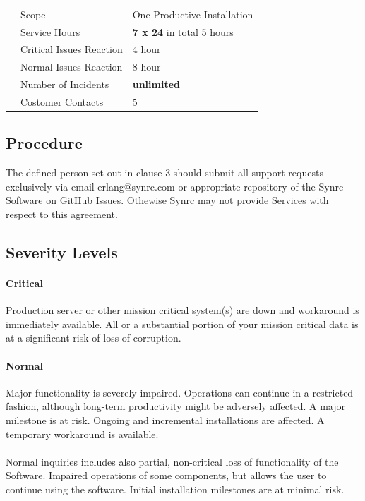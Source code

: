 \documentclass[11pt,oneside]{article}
\begin{document}
\begin{tabular}{lll}
        & Scope                    & One Productive Installation \\
        & Service Hours            & {\bf 7 x 24} in total 5 hours\\
        & Critical Issues Reaction & 4 hour \\
        & Normal Issues Reaction   & 8 hour \\
        & Number of Incidents      & {\bf unlimited} \\
        & Costomer Contacts        & 5 \\
\end{tabular}

\subsection*{Procedure}
The defined person set out in clause 3 should submit all support requests exclusively
via email erlang@synrc.com or appropriate repository of the Synrc Software on GitHub Issues.
Othewise Synrc may not provide Services with respect to this agreement.

\subsection*{Severity Levels}
\paragraph{{\bf Critical}}
Production server or other mission critical system(s) are down and workaround is
immediately available. All or a substantial portion of your mission critical data is
at a significant risk of loss of corruption.
\paragraph{{\bf Normal}}
Major functionality is severely impaired. Operations can continue in a restricted fashion,
although long-term productivity might be adversely affected. A major milestone is at risk.
Ongoing and incremental installations are affected. A temporary workaround is available.
\paragraph{}
Normal inquiries includes also partial, non-critical loss of functionality of the Software.
Impaired operations of some components, but allows the user to continue using the software.
Initial installation milestones are at minimal risk.
\end{document}
